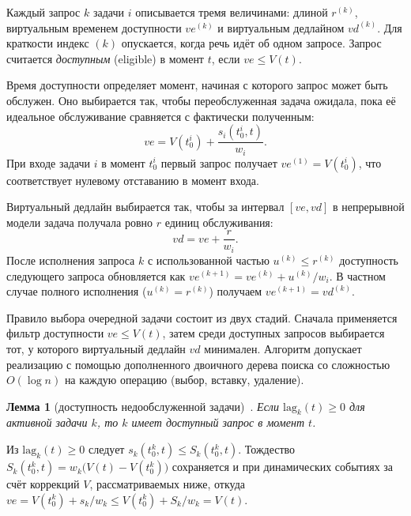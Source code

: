 \documentclass[14pt, oneside]{extbook}
\begin{document}
        Каждый запрос $k$ задачи $i$ описывается тремя
        величинами: длиной $r^{(k)}$, виртуальным временем
        доступности $ve^{(k)}$ и виртуальным дедлайном $vd^{(k)}$.
        Для краткости индекс $(k)$ опускается, когда речь идёт
        об одном запросе. Запрос считается \emph{доступным}
        (eligible) в момент $t$, если $ve \leq V(t)$.

        Время доступности определяет момент, начиная с которого
        запрос может быть обслужен. Оно выбирается так, чтобы
        переобслуженная задача ожидала, пока её идеальное
        обслуживание сравняется с фактически полученным:
        \begin{equation}\label{eq:ve}
                ve = V(t_0^i) + \frac{s_i(t_0^i, t)}{w_i}.
        \end{equation}
        При входе задачи $i$ в момент $t_0^i$ первый запрос
        получает $ve^{(1)} = V(t_0^i)$, что соответствует нулевому
        отставанию в момент входа.

        Виртуальный дедлайн выбирается так, чтобы за интервал
        $[ve, vd]$ в непрерывной модели задача получала ровно $r$
        единиц обслуживания:
        \begin{equation}\label{eq:vd}
                vd = ve + \frac{r}{w_i}.
        \end{equation}
        После исполнения запроса $k$ с использованной частью
        $u^{(k)} \leq r^{(k)}$ доступность следующего запроса
        обновляется как $ve^{(k+1)} = ve^{(k)} + u^{(k)}/w_i$.
        В частном случае полного исполнения ($u^{(k)} = r^{(k)}$)
        получаем $ve^{(k+1)} = vd^{(k)}$.

        Правило выбора очередной задачи состоит из двух стадий.
        Сначала применяется фильтр доступности $ve \leq V(t)$, затем
        среди доступных запросов выбирается тот, у которого виртуальный
        дедлайн $vd$ минимален. Алгоритм допускает реализацию
        с помощью дополненного двоичного дерева поиска
        со сложностью $O(\log n)$ на каждую операцию
        (выбор, вставку, удаление).

        \textbf{Лемма 1} (доступность недообслуженной задачи)~\cite{stoica}.
        \textit{Если $\mathrm{lag}_k(t) \geq 0$ для активной
        задачи $k$, то $k$ имеет доступный запрос в момент $t$.}

        Из $\mathrm{lag}_k(t) \geq 0$ следует
        $s_k(t_0^k, t) \leq S_k(t_0^k, t)$. Тождество
        $S_k(t_0^k, t) = w_k\bigl(V(t)-V(t_0^k)\bigr)$ сохраняется
        и при динамических событиях за счёт коррекций $V$,
        рассматриваемых ниже, откуда
        $ve = V(t_0^k) + s_k/w_k \leq V(t_0^k) + S_k/w_k = V(t)$.
\end{document}
